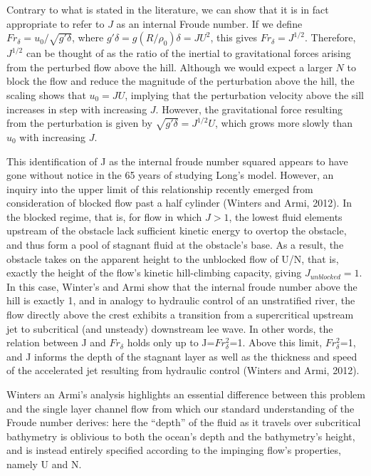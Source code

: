 \documentclass[12pt]{article}
\begin{document}
Contrary to what is stated in the literature, we can show that it is
in fact appropriate to refer to $J$ as an internal Froude number. If we define
$Fr_\delta = u_0/\sqrt{g' \delta}$, where $g'\delta =g (R/\rho_0) \delta = J U^2$, this gives
$Fr_{\delta} = J^{1/2}$. Therefore, $J^{1/2}$ can be thought of as 
the ratio of the inertial to gravitational forces arising from the perturbed
flow above the hill. Although we would expect a larger $N$ to block the flow and
reduce the magnitude of the perturbation above the hill, the scaling shows that
$u_0 = J U$, implying that the perturbation velocity above the sill increases in step with
increasing $J$. However, the gravitational force resulting from the perturbation is
given by $\sqrt{g'\delta} = J^{1/2} U$, which grows more slowly than $u_0$ with
increasing $J$.

This identification of J as the internal froude number squared appears to have gone without notice in the 65 years of studying Long's model. However, an inquiry into the upper limit of this relationship recently emerged from consideration of blocked flow past a half cylinder (Winters and Armi, 2012). In the blocked regime, that is, for flow in which $J>1$, the lowest fluid elements upstream of the obstacle lack sufficient kinetic energy to overtop the obstacle, and thus form a pool of stagnant fluid at the obstacle's base. As a result, the obstacle takes on the apparent height to the unblocked flow of U/N, that is, exactly the height of the flow's kinetic hill-climbing capacity, giving $J_{unblocked}=1$. In this case, Winter's and Armi show that the internal froude number above the hill is exactly 1, and in analogy to hydraulic control of an unstratified river, the flow directly above the crest exhibits a transition from a supercritical upstream jet to subcritical (and unsteady) downstream lee wave. In other words, the relation between J and $Fr_{\delta}$ holds only up to J=$Fr_{\delta}^2$=1. Above this limit, $Fr_{\delta}^2$=1, and J informs the depth of the stagnant layer as well as the thickness and speed of the accelerated jet resulting from hydraulic control (Winters and Armi, 2012).

Winters an Armi's analysis highlights an essential difference between this problem and the single layer channel flow from which our standard understanding of the Froude number derives: here the ``depth'' of the fluid as it travels over subcritical bathymetry is oblivious to both the ocean's depth and the bathymetry's height, and is instead entirely specified according to the impinging flow's properties, namely U and N. 
\end{document}
